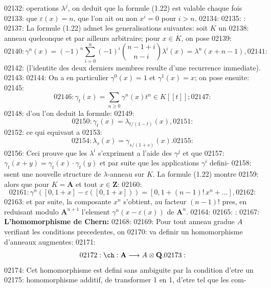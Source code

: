 02132: operations $\lambda^j$, on deduit que la formule (1.22) est valable chaque fois
02133: que $\varepsilon(x) = n$, que l'on ait ou non $x^i = 0$ pour $i > n$.
02134: 
02135: : 
02137: La formule (1.22) admet les generalisations suivantes: soit $K$ un
02138: anneau quelconque et par ailleurs arbitraire; pour $x \in K$, on pose
02139: \begin{equation}
02140: \gamma^n(x) = (-1)^n \sum_{i=0}^{n} (-1)^i \binom{n-1+i}{n-i} \lambda^i(x) = \lambda^n(x+n-1),
02141: \end{equation}
02142: (l'identite des deux derniers membres resulte d'une recurrence immediate).
02143: 
02144: On a en particulier $\gamma^0(x) = 1$ et $\gamma^1(x) = x$; on pose ensuite:
02145: \begin{equation}
02146: \gamma_t(x) = \sum_{n \geq 0} \gamma^n(x) t^n \in K[[t]];
02147: \end{equation}
02148: d'ou l'on deduit la formule:
02149: \begin{equation}
02150: \gamma_t(x) = \lambda_{t/(1-t)}(x),
02151: \end{equation}
02152: ce qui equivaut a
02153: \begin{equation}
02154: \lambda_s(x) = \gamma_{s/(1+s)}(x).
02155: \end{equation}
02156: Ceci prouve que les $\lambda^i$ s'expriment a l'aide des $\gamma^j$ et que
02157: $\gamma_t(x+y) = \gamma_t(x) \cdot \gamma_t(y)$ et par suite que les applications $\gamma^i$ defini-
02158: ssent une nouvelle structure de $\lambda$-anneau sur $K$. La formule (1.22) montre
02159: alors que pour $K = \mathbf{A}$ et tout $x \in \mathbf{Z}$:
02160: \begin{equation}
02161: \gamma^n([0, 1+x] - \varepsilon([0, 1+x])) = [0, 1 + (n-1)! \, x^n + \ldots],
02162: \end{equation}
02163: et par suite, la composante $x^n$ s'obtient, au facteur $(n-1)!$ pres, en reduisant modulo $\mathbf{A}^{n+1}$ l'element $\gamma^n(x - \varepsilon(x))$ de $\mathbf{A}^n$.
02164: 
02165: : 
02167: \textbf{L'homomorphisme de Chern:}
02168: 
02169: Pour tout anneau gradue $A$ verifiant les conditions precedentes, on
02170: va definir un homomorphisme d'anneaux augmentes:
02171: \begin{equation}
02172: \ch: \mathbf{A} \longrightarrow A \otimes \mathbf{Q}.
02173: \end{equation}
02174: Cet homomorphisme est defini sans ambiguite par la condition d'etre un
02175: homomorphisme additif, de transformer 1 en 1, d'etre tel que les com-
